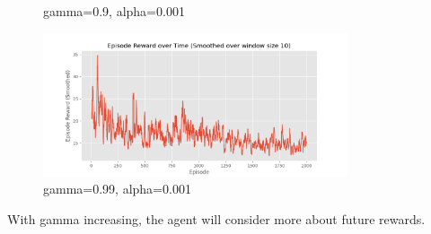 \documentclass[a4paper]{article}
\theoremstyle{definition}
\newenvironment{soln}{
    \leavevmode\color{blue}\ignorespaces
}{}
\begin{document}
\begin{enumerate}
\begin{soln}
\begin{figure}[H]
			      \caption*{gamma=0.9, alpha=0.001}
		      \end{figure}
		      \begin{figure}[H]
			      \centering
			      \includegraphics[width=0.8\textwidth]{img/0.99g0.001a.png}
			      \caption*{gamma=0.99, alpha=0.001}
		      \end{figure}

		      With gamma increasing, the agent will consider more about future rewards.


\end{soln}
\end{enumerate}
\end{document}
